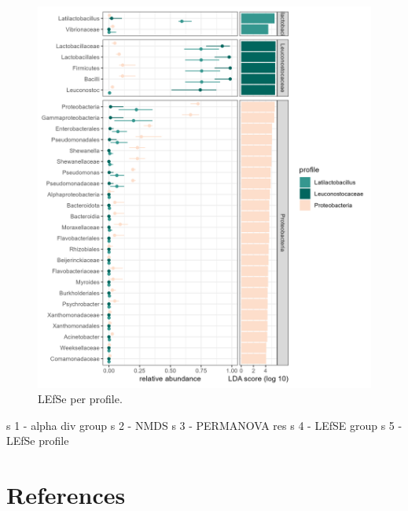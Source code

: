 \documentclass[preprint,3p,
a4paper]{elsarticle} %
\begin{document}
\begin{figure}

{\centering \includegraphics[width=1\linewidth]{lefsestatplot_profile} 

}

\caption{\label{figSM5} LEfSe per profile.  }\label{fig:figSM5}
\end{figure}

s 1 - alpha div group s 2 - NMDS s 3 - PERMANOVA res s 4 - LEfSE group s
5 - LEfSe profile

\newpage

\hypertarget{references}{%
\section*{References}\label{references}}
\end{document}
